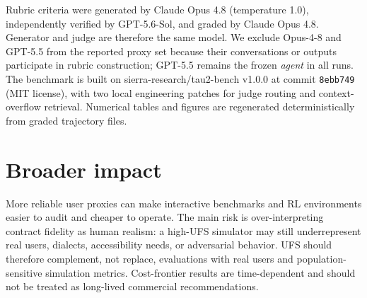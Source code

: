 \documentclass{article}
\begin{document}
Rubric criteria were generated by Claude Opus 4.8 (temperature 1.0), independently verified by GPT-5.6-Sol, and graded by Claude Opus 4.8. Generator and judge are therefore the same model. We exclude Opus-4-8 and GPT-5.5 from the reported proxy set because their conversations or outputs participate in rubric construction; GPT-5.5 remains the frozen \emph{agent} in all runs. The benchmark is built on sierra-research/tau2-bench v1.0.0 at commit \texttt{8ebb749} (MIT license), with two local engineering patches for judge routing and context-overflow retrieval. Numerical tables and figures are regenerated deterministically from graded trajectory files.

\section{Broader impact}
\label{app:impact}
More reliable user proxies can make interactive benchmarks and RL environments easier to audit and cheaper to operate. The main risk is over-interpreting contract fidelity as human realism: a high-UFS simulator may still underrepresent real users, dialects, accessibility needs, or adversarial behavior. UFS should therefore complement, not replace, evaluations with real users and population-sensitive simulation metrics. Cost-frontier results are time-dependent and should not be treated as long-lived commercial recommendations.
\end{document}
